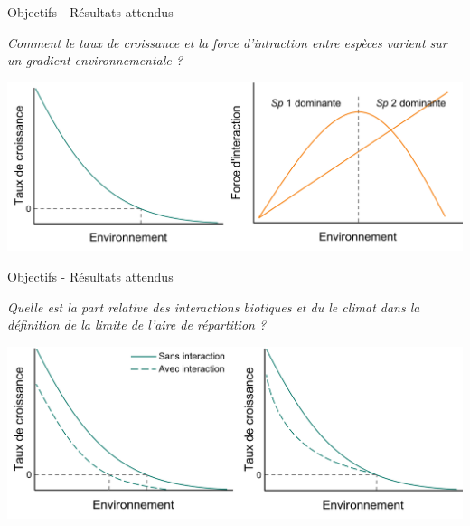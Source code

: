 \documentclass[11pt, compress, aspectratio=1610]{beamer}
\begin{document}
\begin{frame}{Objectifs - Résultats attendus}
\protect\hypertarget{objectifs---ruxe9sultats-attendus}{}

\centering

\emph{Comment le taux de croissance et la force d’intraction entre
espèces varient sur un gradient environnementale ?}

\vspace*{10mm}
\centering

\includegraphics[scale=0.45]{figures/output_chap2a.png}

\par

\end{frame}

\begin{frame}{Objectifs - Résultats attendus}
\protect\hypertarget{objectifs---ruxe9sultats-attendus-1}{}

\centering

\emph{Quelle est la part relative des interactions biotiques et du le
climat dans la définition de la limite de l’aire de répartition ?}

\vspace*{10mm}
\centering

\includegraphics[scale=0.45]{figures/output_chap2b.png}

\par

\end{frame}
\end{document}
